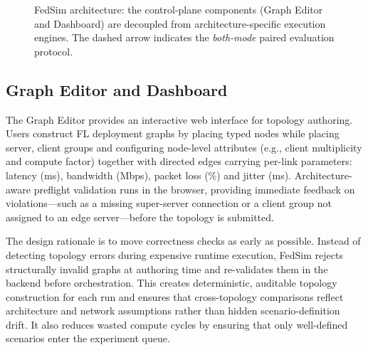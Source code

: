 \documentclass[conference]{IEEEtran}
\begin{document}
\begin{figure}[t]
\centering
{}
\caption{FedSim architecture: the control-plane components (Graph Editor and Dashboard) are decoupled from architecture-specific execution engines. The dashed arrow indicates the \textit{both-mode} paired evaluation protocol.}
\label{fig:fedsim-architecture}
\end{figure}

\subsection{Graph Editor and Dashboard}
The Graph Editor provides an interactive web interface for topology authoring. Users construct FL deployment graphs by placing typed nodes while placing server, client groups and configuring node-level attributes (e.g., client multiplicity and compute factor) together with directed edges carrying per-link parameters: latency (ms), bandwidth (Mbps), packet loss (\%) and jitter (ms). Architecture-aware preflight validation runs in the browser, providing immediate feedback on violations—such as a missing super-server connection or a client group not assigned to an edge server—before the topology is submitted.

The design rationale is to move correctness checks as early as possible. Instead of detecting topology errors during expensive runtime execution, FedSim rejects structurally invalid graphs at authoring time and re-validates them in the backend before orchestration. This creates deterministic, auditable topology construction for each run and ensures that cross-topology comparisons reflect architecture and network assumptions rather than hidden scenario-definition drift. It also reduces wasted compute cycles by ensuring that only well-defined scenarios enter the experiment queue.
\end{document}
